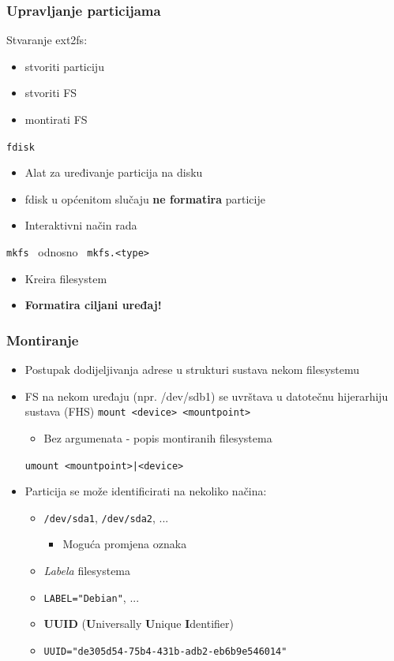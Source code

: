 \documentclass[t]{beamer}
\begin{document}
\begin{frame}[fragile]
	\frametitle{Upravljanje particijama}
    Stvaranje ext2fs:
    \begin{itemize}
        \item stvoriti particiju
        \item stvoriti FS
        \item montirati FS
    \end{itemize}
	\vfill
	\texttt{fdisk}
	\begin{itemize}
		\item Alat za uređivanje particija na disku
		\item fdisk u općenitom slučaju \textbf{ne formatira} particije
		\item Interaktivni način rada
	\end{itemize}
	\vfill
	\texttt{mkfs} \, odnosno \, \verb|mkfs.<type>|
	\begin{itemize}
		\item Kreira filesystem
		\item \textbf{Formatira ciljani uređaj!}
	\end{itemize}
\end{frame}



\begin{frame}[fragile]
	\frametitle{Montiranje}
	\begin{itemize}
		\item Postupak dodijeljivanja adrese u strukturi sustava nekom filesystemu
		\item FS na nekom uređaju (npr. /dev/sdb1) se uvrštava u datotečnu hijerarhiju sustava (FHS)
		\vfill
		\verb|mount <device> <mountpoint>|
		\begin{itemize}
			\item Bez argumenata - popis montiranih filesystema
		\end{itemize}
		\verb/umount <mountpoint>|<device>/
		\vfill
		\item Particija se može identificirati na nekoliko načina: 
		\begin{itemize}
			\item \verb|/dev/sda1|, \verb|/dev/sda2|, ...
			\begin{itemize}
				\item Moguća promjena oznaka
			\end{itemize}
			\item \textit{Labela} filesystema
			\item[] \verb|LABEL="Debian"|, ...
			\item \textbf{UUID} (\textbf{U}niversally \textbf{U}nique \textbf{I}dentifier)
			\item[] \verb|UUID="de305d54-75b4-431b-adb2-eb6b9e546014"|
		\end{itemize}
	\end{itemize}
\end{frame}
\end{document}
